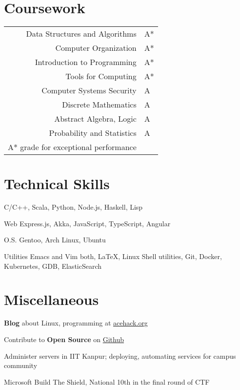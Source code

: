 \documentclass{tccv}
\begin{document}
\section{Coursework}
\begin{tabularx}{\linewidth}{ r l }
  Data Structures and Algorithms & A*\\
  Computer Organization & A*\\
  Introduction to Programming & A*\\
  Tools for Computing & A*\\
  Computer Systems Security & A\\
  Discrete Mathematics & A\\
  Abstract Algebra, Logic & A\\
  Probability and Statistics & A\\
  \footnotesize{A* grade for exceptional performance}&\\
\end{tabularx}

\vspace{-0.4cm}
\section{Technical Skills}

C/C++, Scala, Python, Node.js, Haskell, Lisp

\vspace{0.2cm}
\begin{factlist}

\item{\small{Web}}
  {Express.js, Akka, JavaScript, TypeScript, Angular}

  \vspace{-0.2cm}
\item{\small{O.S.}}
  {Gentoo, Arch Linux, Ubuntu}

  \vspace{-0.2cm}
\item {\small{Utilities}}
  {Emacs and Vim both, \LaTeX, Linux Shell utilities, Git, Docker,
    Kubernetes, GDB, ElasticSearch}

\end{factlist}

\vspace{-0.6cm}
\section{Miscellaneous}
\vspace{0.2cm}
\begin{thinitemize}
\item \textbf{Blog} about Linux, programming at \href{http://acehack.org}{acehack.org}
\item Contribute to \textbf{Open Source}
  on \href{https://github.com/sakshamsharma}{Github}
\item Administer servers in IIT Kanpur; deploying,
  automating services for campus community
\item Microsoft Build The Shield, National 10th in the final round of CTF
\end{thinitemize}
\end{document}

